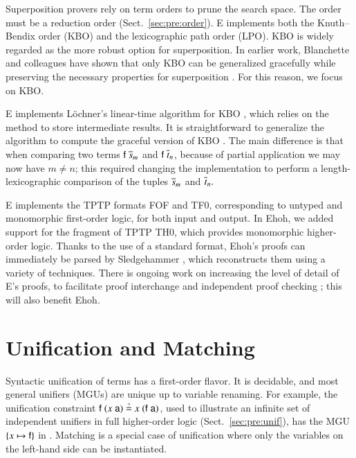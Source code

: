  Superposition provers rely on term orders to prune the search
space. The order must be a reduction order
(Sect.~\ref{sec:pre:order}). E implements both the Knuth--Bendix order (KBO) and the lexicographic path order
(LPO). KBO is widely regarded as the more
robust option for superposition.
%
In earlier work, Blanchette and colleagues have shown that only KBO can be
generalized gracefully while preserving the necessary properties for
superposition \cite{bbww-17-kbo,bww-17-rpo}. For this
reason, we focus on KBO.

E implements L\"ochner's linear-time algorithm for KBO
\cite{bl-06-kbo}, which relies on the  method to store
intermediate results. %
It is straightforward to generalize the algorithm to compute the
graceful \lfhol{} version of KBO \cite{bbww-17-kbo}.
The main difference is that when comparing two terms $\mathsf{f} \; \overline{s}_{m}$
and $\mathsf{f} \; \overline{t}_{n}$, because of partial application we may now
have $m \not= n$; this required changing the implementation to
perform a length-lexicographic comparison of the tuples $\overline{s}_{m}$ and
$\overline{t}_{n}.$

E implements the TPTP \cite{gs-17-tptp} formats FOF and TF0, corresponding to
untyped and mono\-morphic first-order logic, for both input and output. In
Ehoh, we added support for the \lfhol{} fragment of TPTP TH0, which provides
mono\-morphic higher-order logic. Thanks to the use of a standard format,
Ehoh's proofs can immediately be parsed by Sledgehammer
\cite{pb-12-sh}, which reconstructs them using a variety of
techniques.
There is ongoing work on increasing the level of detail of E's proofs, to
facilitate proof interchange and independent proof checking
\cite{rs-17-checkable};
this will also benefit Ehoh.

\section{Unification and Matching}
\label{sec:ehoh:unif-match}

Syntactic unification of \lfhol{} terms has a first-order flavor.
It is decidable, and most general unifiers (MGUs) are unique up to variable
renaming. For example, the unification constraint $\cst{f} \; (x \;
\cst{a}) \unif x \; (\cst{f} \; \cst{a})$, used to illustrate an infinite set of 
independent unifiers in full higher-order logic (Sect.~\ref{sec:pre:unif}), has the MGU 
$\{x \mapsto \mathsf{f}\}$ in \lfhol{}.
Matching is a special case of unification
where only the variables on the left-hand side can be instantiated.

